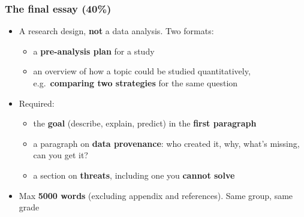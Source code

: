 \begin{frame}
\frametitle{The final essay (40\%)}
\centering

\begin{itemize}
  \item A research design, \textbf{not} a data analysis. Two formats:
  \begin{itemize}
    \item a \textbf{pre-analysis plan} for a study
    \item an overview of how a topic could be studied quantitatively, e.g.\ \textbf{comparing two strategies} for the same question
  \end{itemize}
  \vspace{8pt}
  \item<2-> Required:
  \begin{itemize}
    \item the \textbf{goal} (describe, explain, predict) in the \textbf{first paragraph}
    \item a paragraph on \textbf{data provenance}: who created it, why, what's missing, can you get it?
    \item a section on \textbf{threats}, including one you \textbf{cannot solve}
  \end{itemize}
  \vspace{8pt}
  \item<3-> Max \textbf{5000 words} (excluding appendix and references). Same group, same grade
\end{itemize}

\end{frame}

